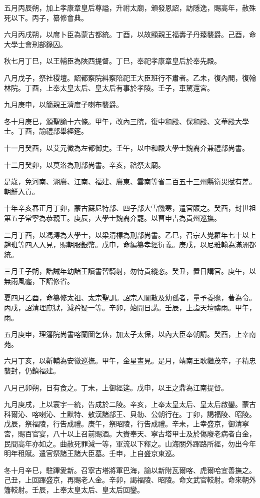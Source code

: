 \begin{pinyinscope}
五月丙辰朔，加上孝康章皇后尊謚，升祔太廟，頒發恩詔，訪隱逸，賜高年，赦殊死以下。丙子，纂修會典。

六月丙戌朔，以席卜臣為蒙古都統。丁酉，以故顯親王福壽子丹臻襲爵。己酉，命大學士會刑部錄囚。

秋七月丁巳，以王輔臣為陜西提督。丁巳，奉祀孝康章皇后於奉先殿。

八月戊子，祭社稷壇。詔都察院糾察陪祀王大臣班行不肅者。乙未，復內閣，復翰林院。丁酉，上奉太皇太后、皇太后有事於孝陵。壬子，車駕還宮。

九月庚申，以簡親王濟度子喇布襲爵。

冬十月庚巳，頒聖諭十六條。甲午，改內三院，復中和殿、保和殿、文華殿大學士。丁酉，諭禮部舉經筵。

十一月癸酉，以艾元徵為左都御史。壬午，以中和殿大學士魏裔介兼禮部尚書。

十二月癸卯，以莫洛為刑部尚書。辛亥，祫祭太廟。

是歲，免河南、湖廣、江南、福建、廣東、雲南等省二百五十三州縣衛災賦有差。朝鮮入貢。

十年辛亥春正月丁卯，蒙古蘇尼特部、四子部大雪饑寒，遣官賑之。癸酉，封世祖第五子常寧為恭親王。庚辰，大學士魏裔介罷。以曹申吉為貴州巡撫。

二月丁酉，以馮溥為大學士，以梁清標為刑部尚書。乙巳，召宗人覺羅年七十以上趙班等四人入見，賜朝服銀幣。戊申，命編纂孝經衍義。庚戌，以尼雅翰為滿洲都統。

三月壬子朔，誥誡年幼諸王讀書習騎射，勿恃貴縱恣。癸丑，置日講官。庚午，以無雨風霾，下詔修省。

夏四月乙酉，命纂修太祖、太宗聖訓。詔宗人閒散及幼孤者，量予養贍，著為令。丙戌，詔清理庶獄，減矜疑一等。辛卯，始開日講。壬辰，上詣天壇禱雨。甲午，雨。

五月庚申，理籓院尚書喀蘭圖乞休，加太子太保，以內大臣奉朝請。癸酉，上幸南苑。

六月丁亥，以靳輔為安徽巡撫。甲午，金星晝見。是月，靖南王耿繼茂卒，子精忠襲封，仍鎮福建。

八月己卯朔，日有食之。丁未，上御經筵。戊申，以王之鼎為江南提督。

九月庚戌，上以寰宇一統，告成於二陵。辛亥，上奉太皇太后、皇太后啟鑾。蒙古科爾沁、喀喇沁、土默特、敖漢諸部王、貝勒、公朝行在。丁卯，謁福陵、昭陵。戊辰，祭福陵，行告成禮。庚午，祭昭陵，行告成禮。辛未，上幸盛京，御清寧宮，賜百官宴，八十以上召前賜酒。大賚奉天、寧古塔甲士及於傷廢老病者白金，民間高年亦如之。曲赦死罪減一等，軍流以下釋之。山海關外蹕路所經，勿出今年明年租賦。遣官祭諸王諸大臣墓。壬申，上自盛京東巡。

冬十月辛巳，駐蹕愛新。召寧古塔將軍巴海，諭以新附瓦爾喀、虎爾哈宜善撫之。己丑，上回蹕盛京，再賜老人金。辛卯，謁福陵、昭陵。命文武官較射。命來朝外籓較射。壬辰，上奉太皇太后、皇太后回鑾。


\end{pinyinscope}
